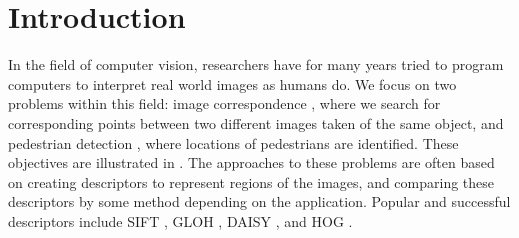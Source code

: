 \documentclass[thesis.tex]{subfiles}
\begin{document}
\chapter{Introduction}
\label{sec:introduction}

In the field of computer vision, researchers have for many years tried to program computers to interpret real world images as humans do. We focus on two problems within this field: image correspondence \cite{dahl2011finding}, where we search for corresponding points between two different images taken of the same object, and pedestrian detection \cite{felzenszwalb2008discriminatively}, where locations of pedestrians are identified. These objectives are illustrated in . The approaches to these problems are often based on creating descriptors to represent regions of the images, and comparing these descriptors by some method depending on the application. Popular and successful descriptors include SIFT \cite{lowe2004distinctive}, GLOH \cite{mikolajczyk2005performance}, DAISY \cite{tola2008fast}, and HOG \cite{dalal2005histograms,felzenszwalb2009object}.
\end{document}
